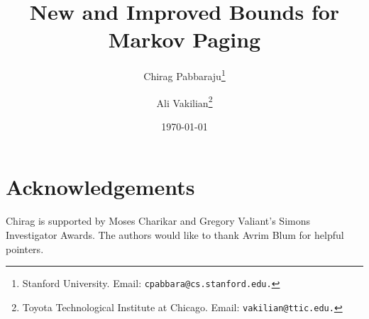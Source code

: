 \documentclass[11pt]{article}
\author{
    Chirag Pabbaraju\thanks{Stanford University. Email: \texttt{cpabbara@cs.stanford.edu.}}
    \and
    Ali Vakilian\thanks{Toyota Technological Institute at Chicago. Email: \texttt{vakilian@ttic.edu.}}
}
\title{New and Improved Bounds for Markov Paging}
\date{\today}
\begin{document}
\maketitle



\newpage








\section*{Acknowledgements}
Chirag is supported by Moses Charikar and Gregory Valiant's Simons Investigator Awards. The authors would like to thank Avrim Blum for helpful pointers.



\end{document}
